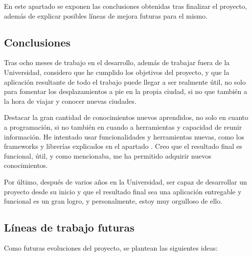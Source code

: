 
En este apartado se exponen las conclusiones obtenidas tras finalizar el proyecto, además de explicar posibles líneas de mejora futuras para el mismo.

\subsection{Conclusiones}
Tras ocho meses de trabajo en el desarrollo, además de trabajar fuera de la Universidad, considero que he cumplido los objetivos del proyecto, y que la aplicación resultante de todo el trabajo puede llegar a ser realmente útil, no solo para fomentar los desplazamientos a pie en la propia ciudad, si no que también a la hora de viajar y conocer nuevas ciudades.


Destacar la gran cantidad de conocimientos nuevos aprendidos, no solo en cuanto a programación, si no también en cuando a herramientas y capacidad de reunir información. He intentado usar funcionalidades y herramientas nuevas, como los frameworks y librerías explicados en el apartado . Creo que el resultado final es funcional, útil, y como mencionaba, me ha permitido adquirir nuevos conocimientos.


Por último, después de varios años en la Universidad, ser capaz de desarrollar un proyecto desde su inicio y que el resultado final sea una aplicación entregable y funcional es un gran logro, y personalmente, estoy muy orgulloso de ello.


\subsection{Líneas de trabajo futuras}\label{futuras}
Como futuras evoluciones del proyecto, se plantean las siguientes ideas:

